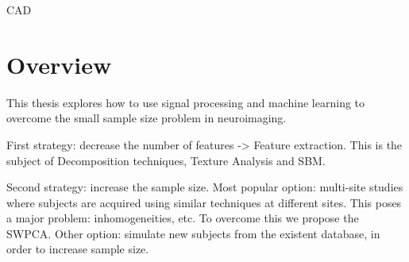 \ac{CAD}

\section{Overview}
This thesis explores how to use signal processing and machine learning to overcome the small sample size problem in neuroimaging. 

First strategy: decrease the number of features -> Feature extraction. This is the subject of Decomposition techniques, Texture Analysis and \ac{SBM}. 

Second strategy: increase the sample size. Most popular option: multi-site studies where subjects are acquired using similar techniques at different sites. This poses a major problem: inhomogeneities, etc. To overcome this we propose the \ac{SWPCA}. Other option: simulate new subjects from the existent database, in order to increase sample size. 